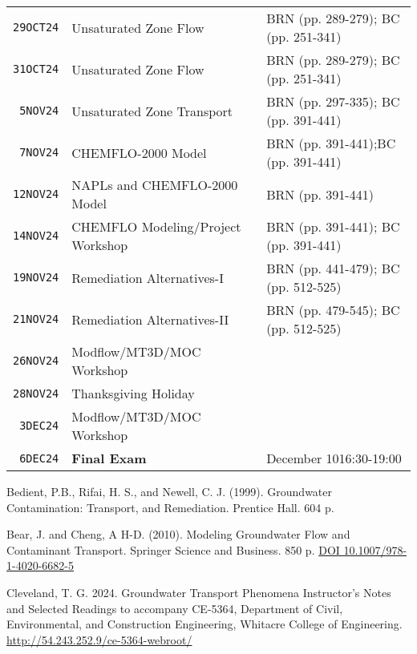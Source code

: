 \documentclass[12pt]{article}
\begin{document}
\begin{table}[ht!]
\begin{tabular}{p{0.5in}p{3.1in}p{3.0in}}
\texttt{29OCT24} & Unsaturated Zone Flow & BRN (pp. 289-279); BC (pp. 251-341)\\ %
\texttt{31OCT24} & Unsaturated Zone Flow & BRN (pp. 289-279); BC (pp. 251-341)\\ %
\texttt{~5NOV24} & Unsaturated Zone Transport & BRN (pp. 297-335); BC (pp. 391-441)  \\ %
\texttt{~7NOV24} & CHEMFLO-2000 Model & BRN (pp. 391-441);BC (pp. 391-441)  \\ %
\texttt{12NOV24} & NAPLs and CHEMFLO-2000 Model & BRN (pp. 391-441)  \\ %
\texttt{14NOV24} & CHEMFLO Modeling/Project Workshop  & BRN (pp. 391-441); BC (pp. 391-441) \\ %
\texttt{19NOV24} & Remediation Alternatives-I & BRN (pp. 441-479); BC (pp. 512-525) \\ %
\texttt{21NOV24} & Remediation Alternatives-II & BRN (pp. 479-545); BC (pp. 512-525) \\ %
\texttt{26NOV24} & Modflow/MT3D/MOC Workshop &  \\ %
\texttt{28NOV24} & Thanksgiving Holiday &    \\ %
\texttt{~3DEC24} & Modflow/MT3D/MOC Workshop &  \\ %
\texttt{~6DEC24} & \textbf{Final Exam} & December 10\@ 16:30-19:00 \\ %
\hline
   \end{tabular}
   \label{tab:fall2024schedule}
\end{table}


\clearpage



\begin{thebibliography}{}

Bedient, P.B., Rifai, H. S., and Newell, C. J. (1999). Groundwater Contamination: Transport, and Remediation. Prentice Hall. 604 p. 

Bear, J. and Cheng, A H-D. (2010). Modeling Groundwater Flow and Contaminant Transport. Springer Science and Business. 850 p. \url{DOI 10.1007/978-1-4020-6682-5}

Cleveland, T. G. 2024. Groundwater Transport Phenomena Instructor's Notes and Selected Readings to accompany CE-5364, Department of Civil, Environmental, and Construction Engineering, Whitacre College of Engineering. \url{http://54.243.252.9/ce-5364-webroot/}

\end{thebibliography}
\end{document}
